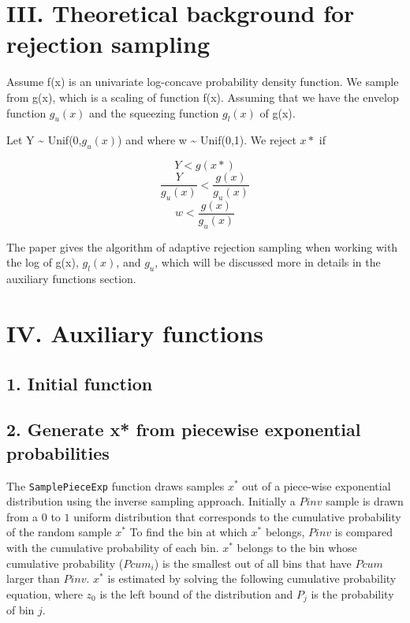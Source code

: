 \documentclass[]{article}
\begin{document}
\section{III. Theoretical background for rejection
sampling}\label{iii.-theoretical-background-for-rejection-sampling}

Assume f(x) is an univariate log-concave probability density function.
We sample from g(x), which is a scaling of function f(x). Assuming that
we have the envelop function \(g_{u}(x)\) and the squeezing function
\(g_{l}(x)\) of g(x).

Let Y \textasciitilde{} Unif(0,\(g_{u}(x)\)) and where w
\textasciitilde{} Unif(0,1). We reject \(x*\) if

\[
Y < g(x*) 
\] \[
\frac{Y}{g_{u}(x)} < \frac{g(x)}{g_{u}(x)}
\] \[
w < \frac{g(x)}{g_{u}(x)} 
\]

The paper gives the algorithm of adaptive rejection sampling when
working with the log of g(x), \(g_{l}(x)\), and \(g_{u}\), which will be
discussed more in details in the auxiliary functions section.

\section{IV. Auxiliary functions}\label{iv.-auxiliary-functions}

\subsection{1. Initial function}\label{initial-function}

\subsection{2. Generate x* from piecewise exponential
probabilities}\label{generate-x-from-piecewise-exponential-probabilities}

The \texttt{SamplePieceExp} function draws samples \(x^*\) out of a
piece-wise exponential distribution using the inverse sampling approach.
Initially a \(Pinv\) sample is drawn from a \(0\) to \(1\) uniform
distribution that corresponds to the cumulative probability of the
random sample \(x^*\) To find the bin at which \(x^*\) belongs, \(Pinv\)
is compared with the cumulative probability of each bin. \(x^*\) belongs
to the bin whose cumulative probability (\(Pcum_i\)) is the smallest out
of all bins that have \(Pcum\) larger than \(Pinv\). \(x^*\) is
estimated by solving the following cumulative probability equation,
where \(z_0\) is the left bound of the distribution and \(P_j\) is the
probability of bin \(j\).
\end{document}
